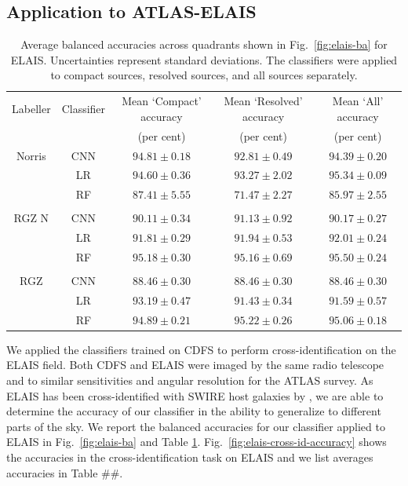 \documentclass[fleqn,usenatbib,usedcolumn]{mnras}
\begin{document}
\subsection{Application to ATLAS-ELAIS}
\label{sec:elais}
\begin{table}
\caption{Average balanced accuracies across quadrants shown in Fig.~\ref{fig:elais-ba} for ELAIS.
      Uncertainties represent standard deviations.
      The classifiers were applied to compact sources, resolved sources, and all
      sources separately.}
    \label{ba:average-accuracies-elais}
\begin{tabular}{ccccc}
\hline
Labeller & Classifier & Mean `Compact' accuracy & Mean `Resolved' accuracy & Mean `All' accuracy \\
 & & (per cent) & (per cent) & (per cent)\\
\hline
Norris & CNN & $94.81 \pm 0.18$ & $92.81 \pm 0.49$ & $94.39 \pm 0.20$ \\
 & LR & $94.60 \pm 0.36$ & $93.27 \pm 2.02$ & $95.34 \pm 0.09$ \\
 & RF & $87.41 \pm 5.55$ & $71.47 \pm 2.27$ & $85.97 \pm 2.55$ \\
 \\
RGZ N & CNN & $90.11 \pm 0.34$ & $91.13 \pm 0.92$ & $90.17 \pm 0.27$ \\
 & LR & $91.81 \pm 0.29$ & $91.94 \pm 0.53$ & $92.01 \pm 0.24$ \\
 & RF & $95.18 \pm 0.30$ & $95.16 \pm 0.69$ & $95.50 \pm 0.24$ \\
 \\
RGZ & CNN & $88.46 \pm 0.30$ & $88.46 \pm 0.30$ & $88.46 \pm 0.30$ \\
 & LR & $93.19 \pm 0.47$ & $91.43 \pm 0.34$ & $91.59 \pm 0.57$ \\
 & RF & $94.89 \pm 0.21$ & $95.22 \pm 0.26$ & $95.06 \pm 0.18$ \\
 \hline
\end{tabular}
\end{table}

We applied the classifiers trained on CDFS to perform cross-identification on the ELAIS field. Both CDFS and ELAIS were imaged by the same radio telescope and to similar sensitivities and angular resolution for the ATLAS survey.  As ELAIS has been cross-identified with SWIRE host galaxies by \citet{middelberg08}, we are able to determine the accuracy of our classifier in the ability to generalize to different parts of the sky. We report the balanced accuracies for our classifier applied to ELAIS in Fig.~\ref{fig:elais-ba} and Table \ref{ba:average-accuracies-elais}. Fig.~\ref{fig:elais-cross-id-accuracy} shows the accuracies in the cross-identification task on ELAIS and we list averages accuracies in Table \#\#.
\end{document}
